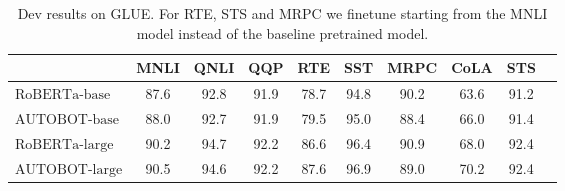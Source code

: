 \begin{table*}[ht]
\centering
\begin{tabular}{lccccccccc}
\toprule
& \bf MNLI & \bf QNLI & \bf QQP & \bf RTE & \bf SST & \bf MRPC & \bf CoLA & \bf STS \\
\midrule 
$\text{RoBERTa-base}$ & 87.6 & 92.8 & 91.9 & 78.7 & 94.8 & 90.2 & 63.6 & 91.2 \\
$\text{AUTOBOT-base}$ & 88.0 & 92.7 & 91.9 & 79.5 & 95.0 & 88.4 & 66.0 & 91.4 \\
\midrule 
$\text{RoBERTa-large}$ & 90.2 & 94.7 & 92.2 & 86.6 & 96.4 & 90.9 & 68.0 & 92.4 \\
$\text{AUTOBOT-large}$ & 90.5 & 94.6 & 92.2 & 87.6 & 96.9 & 89.0 & 70.2 & 92.4 \\
\bottomrule
\end{tabular} %
\caption{
Dev results on GLUE.
For RTE, STS and MRPC we finetune starting from the MNLI model instead of the baseline pretrained model.}

 

\label{tab:roberta_glue}
\end{table*}

